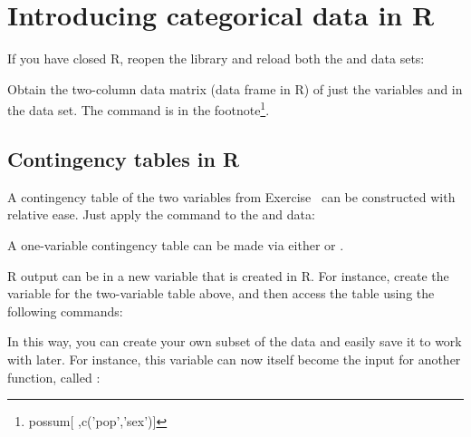 
\section{Introducing categorical data in R}
\label{categoricalDataInR}

If you have closed R, reopen the  library and reload both the  and  data sets: \\


\begin{exercise} \label{getPopAndSexVariablesFromR}
Obtain the two-column data matrix (data frame in R) of just the variables  and  in the  data set. The command is in the footnote\footnote{possum[ ,c('pop','sex')]}.
\end{exercise}

\subsection{Contingency tables in R}

A contingency table of the two variables from Exercise~ can be constructed with relative ease. Just apply the  command to the  and  data: \\


A one-variable contingency table can be made via either  or .

R output can be  in a new variable that is created in R. For instance, create the variable  for the two-variable table above, and then access the table using the following commands: \\


In this way, you can create your own subset of the data and easily save it to work with later. For instance, this variable can now itself become the input for another function, called :

\rSSSpaceTop

